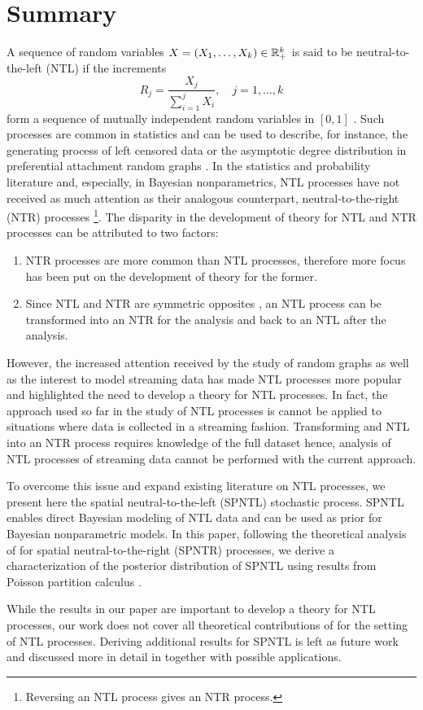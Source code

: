 

\section{Summary}
A sequence of random variables $X = (X_1, \ldots, X_k) \in \mathbb{R}^k_+$ is said to be neutral-to-the-left (NTL) if the increments 
\begin{equation*}
R_j = \frac{X_j}{\sum_{i=1}^j X_i}, \quad j=1, \ldots, k
\end{equation*} 
form a sequence of mutually independent random variables in $[0, 1]$ \cite{bloem2018sampling}. Such processes are common in statistics and can be used to describe, for instance, the generating process of left censored data or the asymptotic degree distribution in preferential attachment random graphs \cite{bloem2017preferential}. In the statistics and probability literature and, especially, in Bayesian nonparametrics, NTL processes have not received as much attention as their analogous counterpart, neutral-to-the-right (NTR) processes \footnote{Reversing an NTL process gives an NTR process.}. The disparity in the development of theory for NTL and NTR processes can be attributed to two factors:

\begin{enumerate}
	\item NTR processes are more common than NTL processes, therefore more focus has been put on the development of theory for the former.
	\item Since NTL and NTR are symmetric opposites \cite{bloem2018sampling}, an NTL process can be transformed into an NTR for the analysis and back to an NTL after the analysis.
\end{enumerate}

However, the increased attention received by the study of random graphs as well as the interest to model streaming data has made NTL processes more popular and highlighted the need to develop a theory for NTL processes. In fact, the approach used so far in the study of NTL processes is cannot be applied to situations where data is collected in a streaming fashion. Transforming and NTL into an NTR process requires knowledge of the full dataset hence, analysis of NTL processes of streaming data cannot be performed with the current approach.

To overcome this issue and expand existing literature on NTL processes, we present here the spatial neutral-to-the-left (SPNTL) stochastic process. SPNTL enables direct Bayesian modeling of NTL data and can be used as prior for Bayesian nonparametric models. In this paper, following the theoretical analysis of \cite{james2006poisson} for spatial neutral-to-the-right (SPNTR) processes, we derive a characterization of the posterior distribution of SPNTL using results from Poisson partition calculus \cite{james2005poisson}.

While the results in our paper are important to develop a theory for NTL processes, our work does not cover all theoretical contributions of \cite{james2006poisson} for the setting of NTL processes. Deriving additional results for SPNTL is left as future work and discussed more in detail in  together with possible applications. 